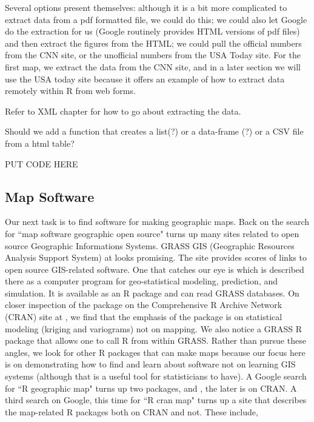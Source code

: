 Several options present themselves: although it is a bit more complicated to extract data
from a pdf formatted file, we could do this; we could also let Google
do the extraction for us (Google routinely provides HTML versions of
pdf files) and then extract the figures from the HTML;
we could pull the official numbers from the CNN site,
or the unofficial numbers from the USA Today site.
For the first map, we extract the data from the CNN site, and in a later
section we will use the USA today site because it offers an example of how to 
extract data remotely within R from web forms.

Refer to XML chapter for how to go about extracting the data.

Should  we add a function that creates a list(?) or
a  data-frame (?) or a CSV file from a html table?

PUT CODE HERE


\subsection{Map Software}
Our next task is to find software for making geographic maps.
Back on  the search for 
``map software geographic open source" turns up many
sites related to open source Geographic Informations Systems.
GRASS GIS (Geographic Resources Analysis Support System) at 
 looks promising.
The site  provides scores of links to 
open source GIS-related software.
One that catches our eye is 
which is described there as a computer program for geo-statistical
modeling, prediction, and simulation.
It is available as an R package and can read GRASS databases.
On closer inspection of the package on the Comprehensive R Archive
Network (CRAN) site at , 
we find that the emphasis of the package is on
statistical modeling (kriging and variograms) not on mapping.
We also notice a GRASS R package that allows one to call R from
within GRASS.
Rather than pursue these angles, we look for other R packages 
that can make maps because our focus here is
on demonstrating how to find and learn about software not
on learning GIS systems (although that is a useful tool for
statisticians to have). A Google search for ``R geographic map"
turns up two packages,  and ,
the later is on CRAN. A third search on Google, this time
for  ``R cran map" turns up a site 
that describes the map-related R packages both on CRAN and not.  
These include,

